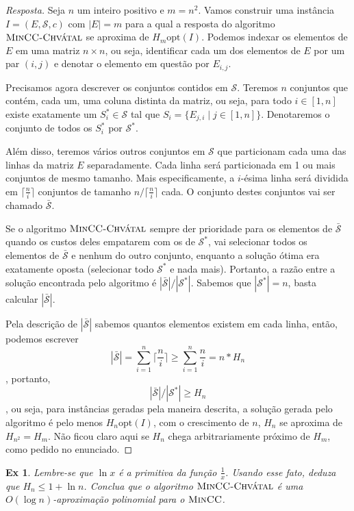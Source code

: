 \documentclass[12pt]{article}
\newcounter{exCounter}
\newtheorem{ex}[exCounter]{Ex}
\begin{document}
\begin{proof}[Resposta]
Seja $n$ um inteiro positivo e $m = n^2$. Vamos construir uma instância $I = (E,\mathcal{S},c)$ com $|E| = m$ para a qual a resposta do algoritmo $\textsc{MinCC-Chvátal}$ se aproxima de $H_m \textrm{opt}(I)$. Podemos indexar os elementos de $E$ em uma matriz $n \times n$, ou seja, identificar cada um dos elementos de $E$ por um par $(i,j)$ e denotar o elemento em questão por $E_{i,j}$.  

Precisamos agora descrever os conjuntos contidos em $\mathcal{S}$. Teremos $n$ conjuntos que contém, cada um, uma coluna distinta da matriz, ou seja, para todo $i \in [1, n]$ existe exatamente um $S^*_i \in \mathcal{S}$ tal que $S_i = \{E_{j,i} \mid j \in [1, n]\}$. Denotaremos o conjunto de todos os $S^*_i$ por $\mathcal{S}^*$.

Além disso, teremos vários outros conjuntos em $\mathcal{S}$ que particionam cada uma das linhas da matriz $E$ separadamente. Cada linha será particionada em 1 ou mais conjuntos de mesmo tamanho. Mais especificamente, a $i$-ésima linha será dividida em $\lceil \frac{n}{i} \rceil$ conjuntos de tamanho $n/\lceil \frac{n}{i} \rceil$ cada. O conjunto destes conjuntos vai ser chamado $\bar{\mathcal{S}}$.

Se o algoritmo $\textsc{MinCC-Chvátal}$ sempre der prioridade para os elementos de $\bar{\mathcal{S}}$ quando os custos deles empatarem com os de $\mathcal{S}^*$, vai selecionar todos os elementos de $\bar{\mathcal{S}}$ e nenhum do outro conjunto, enquanto a solução ótima era exatamente oposta (selecionar todo $\mathcal{S}^*$ e nada mais). Portanto, a razão entre a solução encontrada pelo algoritmo é $|\bar{\mathcal{S}}|/|\mathcal{S}^*|$. Sabemos que $|\mathcal{S}^*| = n$, basta calcular $|\bar{\mathcal{S}}|$.

Pela descrição de $|\bar{\mathcal{S}}|$ sabemos quantos elementos existem em cada linha, então, podemos escrever 
$$|\bar{\mathcal{S}}| = \sum \limits_{i=1}^{n} \lceil \frac{n}{i} \rceil \geq \sum \limits_{i=1}^{n} \frac{n}{i} = n*H_n$$
, portanto,
$$|\bar{\mathcal{S}}|/|\mathcal{S}^*| \geq H_n$$
, ou seja, para instâncias geradas pela maneira descrita, a solução gerada pelo algoritmo é pelo menos $H_n \textrm{opt}(I)$, com o crescimento de $n$, $H_n$ se aproxima de $H_{n^2} = H_m$. Não ficou claro aqui se $H_n$ chega arbitrariamente próximo de $H_m$, como pedido no enunciado.
\end{proof}

\begin{ex}
Lembre-se que $\ln x$ é a primitiva da função $\frac{1}{x}$. Usando esse fato, deduza que $H_n \leq 1 + \ln n$. Conclua que o algoritmo $\textsc{MinCC-Chvátal}$ é uma $O(\log n)$-aproximação polinomial para o $\textsc{MinCC}$.
\end{ex}
\end{document}
